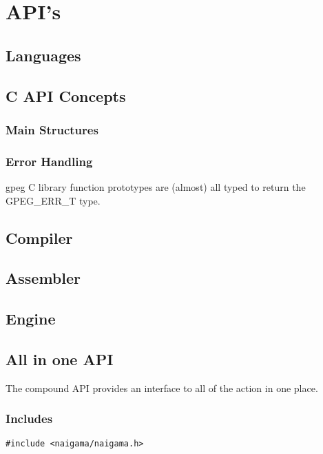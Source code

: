 \section{API's}

\subsection{Languages}

\subsection{C API Concepts}

\subsubsection{Main Structures}

\subsubsection{Error Handling}

gpeg C library function prototypes are (almost) all typed to return
the GPEG\_ERR\_T type.

\subsection{Compiler}

\subsection{Assembler}

\subsection{Engine}

\subsection{All in one API}

The compound API provides an interface to all of the action in one place.

\subsubsection{Includes}

\begin{myquote}
\begin{verbatim}
#include <naigama/naigama.h>
\end{verbatim}
\end{myquote}

